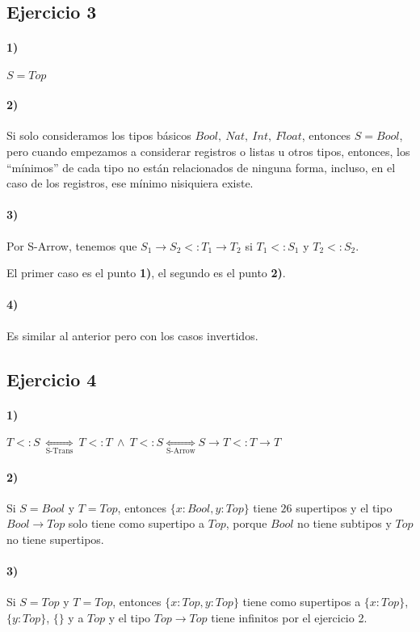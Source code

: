 \documentclass[10pt,a4paper, landscape]{article}
\begin{document}
\subsection{Ejercicio 3}
\paragraph{1)} $S = Top$
\paragraph{2)} Si solo consideramos los tipos básicos $Bool,~Nat,~Int,~Float$, entonces $S=Bool$, pero cuando empezamos a considerar registros o listas u otros tipos, entonces, los ``mínimos'' de cada tipo no están relacionados de ninguna forma, incluso, en el caso de los registros, ese mínimo nisiquiera existe.
\paragraph{3)} Por S-Arrow, tenemos que $S_1\to S_2 <: T_1\to T_2$ si $T_1 <: S_1$ y $T_2 <: S_2$. 

El primer caso es el punto \textbf{1)}, el segundo es el punto \textbf{2)}.
\paragraph{4)} Es similar al anterior pero con los casos invertidos.

\subsection{Ejercicio 4}
\paragraph{1)} $T<:S~\underset{\text{S-Trans}}{\iff} ~ T<:T~\land~T<:S \underset{\text{S-Arrow}}{\iff} S\to T <: T\to T$
\paragraph{2)} Si $S = Bool$ y $T = Top$, entonces $\{x:Bool, y:Top\}$ tiene $26$ supertipos y el tipo $Bool\to Top$ solo tiene como supertipo a $Top$, porque $Bool$ no tiene subtipos y $Top$ no tiene supertipos.
\paragraph{3)} Si $S = Top$ y $T = Top$, entonces $\{x:Top, y:Top\}$ tiene como supertipos a $\{x:Top\}$, $\{y:Top\}$, $\{\}$ y a $Top$ y el tipo $Top\to Top$ tiene infinitos por el ejercicio 2.
\end{document}
